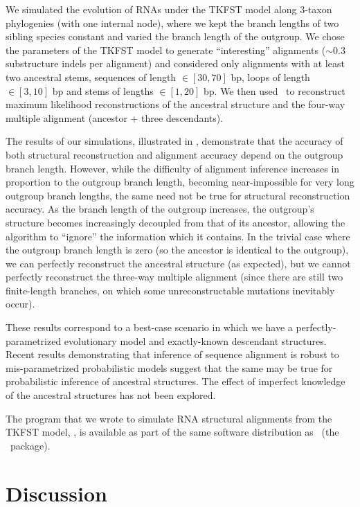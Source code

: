 \documentclass[10pt]{article}
\begin{document}
We simulated the evolution of RNAs under the TKFST model along
3-taxon phylogenies (with one internal node), where we kept the branch lengths of two
sibling species constant and varied the branch length of the
outgroup.  We chose the parameters of the TKFST model to
generate ``interesting'' alignments ($\sim 0.3$ substructure indels per
alignment) and considered only alignments with at least two ancestral
stems, sequences of length $\in [30, 70]$ bp, loops of length $\in [3,
10]$ bp and stems of lengths $\in [1, 20]$ bp.
We then used \indiegram\ to reconstruct maximum likelihood reconstructions of the ancestral structure and the four-way multiple alignment (ancestor + three descendants).

The results of our simulations, illustrated in ,
demonstrate that the accuracy of both structural
reconstruction and alignment accuracy depend on the outgroup
branch length.  However, while the difficulty of alignment inference
increases in proportion to the outgroup branch length, becoming
near-impossible for very long outgroup branch lengths, the same need
not be true for structural reconstruction accuracy.  As the branch
length of the outgroup increases, the outgroup's structure becomes increasingly decoupled from
that of its ancestor, allowing the algorithm to ``ignore'' the
information which it contains.
In the trivial case where the outgroup branch length is zero (so the ancestor is identical to the outgroup),
we can perfectly reconstruct the ancestral structure (as expected),
but we cannot perfectly reconstruct the three-way multiple alignment (since there are still two finite-length branches, on which some unreconstructable mutations inevitably occur).

These results correspond to a best-case scenario in which we
have a perfectly-parametrized evolutionary model and exactly-known descendant structures.
Recent results
demonstrating that inference of sequence alignment is
robust to mis-parametrized probabilistic models \cite{Lunter2007}
suggest that the same may be true for probabilistic inference of
ancestral structures.
The effect of imperfect knowledge of the ancestral structures has not been explored.

The program that we wrote to simulate RNA structural alignments from the TKFST model, \evolsayer, is available as part of the same software distribution as \indiegram\ (the \dart\ package).

\newpage
\section*{Discussion}
\end{document}
